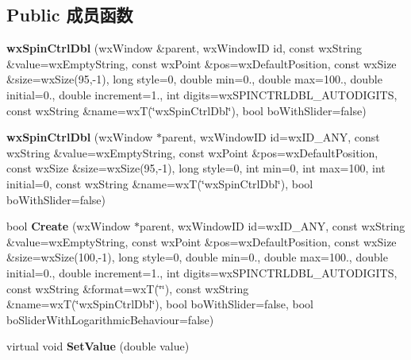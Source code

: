 \subsection*{Public 成员函数}
\begin{DoxyCompactItemize}
\item 
\hypertarget{classwx_spin_ctrl_dbl_a1ee4c59b6fa9ed7c01921dbc614d91ed}{{\bfseries wx\+Spin\+Ctrl\+Dbl} (wx\+Window \&parent, wx\+Window\+I\+D id, const wx\+String \&value=wx\+Empty\+String, const wx\+Point \&pos=wx\+Default\+Position, const wx\+Size \&size=wx\+Size(95,-\/1), long style=0, double min=0., double max=100., double initial=0., double increment=1., int digits=wx\+S\+P\+I\+N\+C\+T\+R\+L\+D\+B\+L\+\_\+\+A\+U\+T\+O\+D\+I\+G\+I\+T\+S, const wx\+String \&name=wx\+T(\char`\"{}wx\+Spin\+Ctrl\+Dbl\char`\"{}), bool bo\+With\+Slider=false)}\label{classwx_spin_ctrl_dbl_a1ee4c59b6fa9ed7c01921dbc614d91ed}

\item 
\hypertarget{classwx_spin_ctrl_dbl_a41f4fde148880a1c115628234258838e}{{\bfseries wx\+Spin\+Ctrl\+Dbl} (wx\+Window $\ast$parent, wx\+Window\+I\+D id=wx\+I\+D\+\_\+\+A\+N\+Y, const wx\+String \&value=wx\+Empty\+String, const wx\+Point \&pos=wx\+Default\+Position, const wx\+Size \&size=wx\+Size(95,-\/1), long style=0, int min=0, int max=100, int initial=0, const wx\+String \&name=wx\+T(\char`\"{}wx\+Spin\+Ctrl\+Dbl\char`\"{}), bool bo\+With\+Slider=false)}\label{classwx_spin_ctrl_dbl_a41f4fde148880a1c115628234258838e}

\item 
\hypertarget{classwx_spin_ctrl_dbl_ac127515c9689836121183ed7502effed}{bool {\bfseries Create} (wx\+Window $\ast$parent, wx\+Window\+I\+D id=wx\+I\+D\+\_\+\+A\+N\+Y, const wx\+String \&value=wx\+Empty\+String, const wx\+Point \&pos=wx\+Default\+Position, const wx\+Size \&size=wx\+Size(100,-\/1), long style=0, double min=0., double max=100., double initial=0., double increment=1., int digits=wx\+S\+P\+I\+N\+C\+T\+R\+L\+D\+B\+L\+\_\+\+A\+U\+T\+O\+D\+I\+G\+I\+T\+S, const wx\+String \&format=wx\+T(\char`\"{}\char`\"{}), const wx\+String \&name=wx\+T(\char`\"{}wx\+Spin\+Ctrl\+Dbl\char`\"{}), bool bo\+With\+Slider=false, bool bo\+Slider\+With\+Logarithmic\+Behaviour=false)}\label{classwx_spin_ctrl_dbl_ac127515c9689836121183ed7502effed}

\item 
\hypertarget{classwx_spin_ctrl_dbl_a4ee20b44925eefb7233f9f91b1f469ae}{virtual void {\bfseries Set\+Value} (double value)}\label{classwx_spin_ctrl_dbl_a4ee20b44925eefb7233f9f91b1f469ae}


\end{DoxyCompactItemize}
